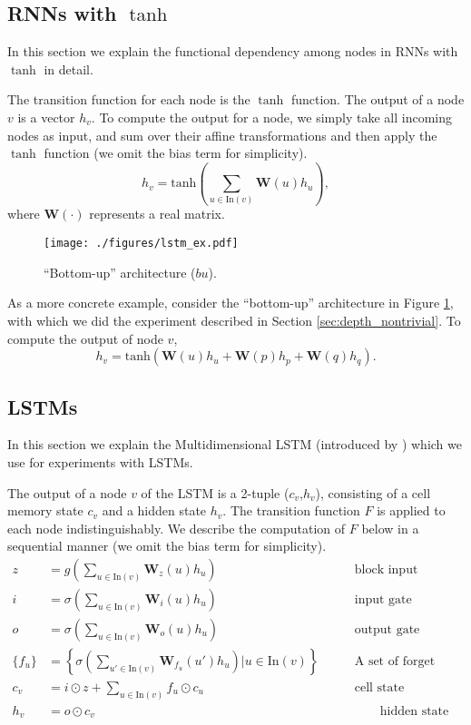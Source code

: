 \subsection{RNNs with $\tanh$}
In this section we explain the functional dependency among nodes in RNNs with $\tanh$ in detail.

The transition function for each node is the $\tanh$ function. The output of a node $v$ is a vector $h_v$. To compute the output for a node, we simply take all incoming nodes as input, and sum over their affine transformations and then apply the $\tanh$ function (we omit the bias term for simplicity).
\begin{equation*}
    h_v = \mathrm{tanh}\left(\sum_{u \in \mathrm{In}(v)}\textbf{W}(u)h_u\right),
\end{equation*}
where $\textbf{W}(\cdot)$ represents a real matrix.

\begin{figure}[htp]
\center
\texttt{[image: ./figures/lstm\_ex.pdf]}
\vspace{-10pt}
\caption{``Bottom-up'' architecture ($bu$).}
\label{fig:bu_ex}
\end{figure}
As a more concrete example, consider the ``bottom-up'' architecture in Figure \ref{fig:bu_ex}, with which we did the experiment described in Section \ref{sec:depth_nontrivial}. To compute the output of node $v$, 
\begin{equation}
h_v = \mathrm{tanh}(\textbf{W}(u)h_u+\textbf{W}(p)h_p+\textbf{W}(q)h_q).
\end{equation}

\subsection{LSTMs}
\label{sec:LSTM}
In this section we explain the Multidimensional LSTM (introduced by \cite{Graves2007}) which we use for experiments with LSTMs.

The output of a node $v$ of the LSTM is a 2-tuple ($c_v$,$h_v$), consisting of a cell memory state $c_v$ and a hidden state $h_v$. The transition function $F$ is applied to each node indistinguishably. We describe the computation of $F$ below in a sequential manner (we omit the bias term for simplicity). 
\begin{align*}
z &= g\left(\sum_{u \in \mathrm{In}(v)}\textbf{W}_z(u)h_u\right) \qquad &\text{block input} \\
i &= \sigma\left(\sum_{u \in \mathrm{In}(v)}\textbf{W}_i(u)h_u\right) \qquad &\text{input gate} \\
o &= \sigma\left(\sum_{u \in \mathrm{In}(v)}\textbf{W}_o(u)h_u\right) \qquad &\text{output gate} \\
\{f_u\} &= \left\{\sigma\left(\sum_{u' \in \mathrm{In}(v)}\textbf{W}_{f_u}(u')h_u\right)|u \in \mathrm{In}(v)\right\} \qquad &\text{A set of forget gates}\\
c_v &= i \odot z + \sum_{u \in \mathrm{In}(v)} f_u \odot c_u  \qquad &\text{cell state} \\
h_v &= o \odot c_v&  \qquad  \text{hidden state}
\end{align*}

